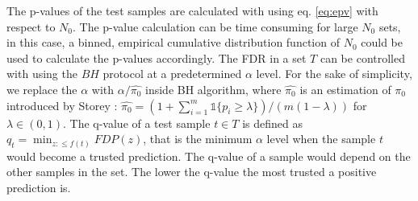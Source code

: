 \documentclass{article}
\newcommand{\mathone}{\mathds{1}}
\begin{document}
The p-values of the test samples are calculated with using eq. \ref{eq:epv} with respect to $N_0$. The p-value calculation can be time consuming for large $N_0$ sets, in this case, a binned, empirical cumulative distribution function of $N_0$ could be used to calculate the p-values accordingly. The FDR in a set $T$ can be controlled with using the $BH$ protocol at a predetermined $\alpha$ level. For the sake of simplicity, we replace the $\alpha$ with $\alpha/\hat{\pi_0}$ inside BH algorithm, where $\hat{\pi_0}$ is an estimation of $\pi_0$ introduced by Storey \cite{storey2004strong}: $\hat{\pi_0} = (1+\sum_{i=1}^m \mathone\{p_i\ge\lambda\} )/(m(1-\lambda))$ for $\lambda\in (0,1)$. The q-value of a test sample $t\in T$ is defined as $q_t=\min_{z:\le f(t)}FDP( z )$, that is the minimum $\alpha$ level when the sample $t$ would become a trusted prediction. The q-value of a sample would depend on the other samples in the set. The lower the q-value the most trusted a positive prediction is.
%
\end{document}
